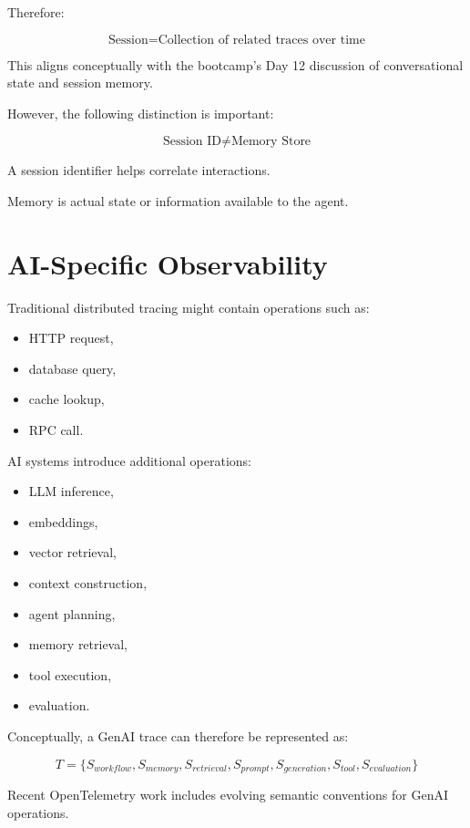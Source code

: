 \documentclass[11pt,a4paper]{article}
\begin{document}
Therefore:

\[
\boxed{
\text{Session} = \text{Collection of related traces over time}
}
\]

This aligns conceptually with the bootcamp's Day 12 discussion of conversational state and session memory.

However, the following distinction is important:

\[
\text{Session ID} \neq \text{Memory Store}
\]

A session identifier helps correlate interactions.

Memory is actual state or information available to the agent.

\section{AI-Specific Observability}

Traditional distributed tracing might contain operations such as:

\begin{itemize}
\item HTTP request,
\item database query,
\item cache lookup,
\item RPC call.
\end{itemize}

AI systems introduce additional operations:

\begin{itemize}
\item LLM inference,
\item embeddings,
\item vector retrieval,
\item context construction,
\item agent planning,
\item memory retrieval,
\item tool execution,
\item evaluation.
\end{itemize}

Conceptually, a GenAI trace can therefore be represented as:

\[
T = \{ S_{workflow}, S_{memory}, S_{retrieval}, S_{prompt}, S_{generation}, S_{tool}, S_{evaluation} \}
\]

Recent OpenTelemetry work includes evolving semantic conventions for GenAI operations.
\end{document}
